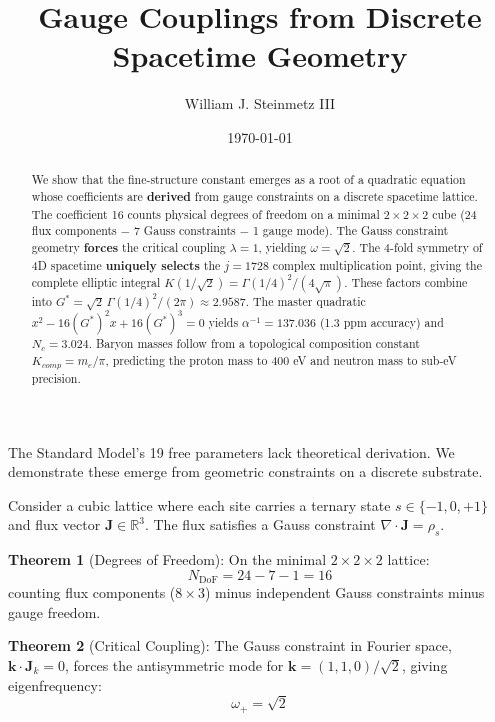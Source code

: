 \documentclass[aps,prl,twocolumn,10pt,groupedaddress,nopacs]{revtex4}
\begin{document}
\title{Gauge Couplings from Discrete Spacetime Geometry}
\author{William J. Steinmetz III}
\date{\today}

\begin{abstract}
We show that the fine-structure constant emerges as a root of a quadratic equation whose coefficients are \textbf{derived} from gauge constraints on a discrete spacetime lattice. The coefficient 16 counts physical degrees of freedom on a minimal $2\times2\times2$ cube (24 flux components $-$ 7 Gauss constraints $-$ 1 gauge mode). The Gauss constraint geometry \textbf{forces} the critical coupling $\lambda = 1$, yielding $\omega = \sqrt{2}$. The 4-fold symmetry of 4D spacetime \textbf{uniquely selects} the $j=1728$ complex multiplication point, giving the complete elliptic integral $K(1/\sqrt{2}) = \Gamma(1/4)^2/(4\sqrt{\pi})$. These factors combine into $G^* = \sqrt{2}\,\Gamma(1/4)^2/(2\pi) \approx 2.9587$. The master quadratic $x^2 - 16(G^*)^2 x + 16(G^*)^3 = 0$ yields $\alpha^{-1} = 137.036$ (1.3 ppm accuracy) and $N_c = 3.024$. Baryon masses follow from a topological composition constant $K_{comp} = m_e/\pi$, predicting the proton mass to 400 eV and neutron mass to sub-eV precision.
\end{abstract}

\maketitle

The Standard Model's 19 free parameters lack theoretical derivation. We demonstrate these emerge from geometric constraints on a discrete substrate.

Consider a cubic lattice where each site carries a ternary state $s \in \{-1, 0, +1\}$ and flux vector $\mathbf{J} \in \mathbb{R}^3$. The flux satisfies a Gauss constraint $\nabla \cdot \mathbf{J} = \rho_s$.

\textbf{Theorem 1} (Degrees of Freedom): On the minimal $2\times2\times2$ lattice:
\begin{equation}
N_{\text{DoF}} = 24 - 7 - 1 = 16
\end{equation}
counting flux components ($8 \times 3$) minus independent Gauss constraints minus gauge freedom.

\textbf{Theorem 2} (Critical Coupling): The Gauss constraint in Fourier space, $\mathbf{k} \cdot \mathbf{J}_k = 0$, forces the antisymmetric mode for $\mathbf{k} = (1,1,0)/\sqrt{2}$, giving eigenfrequency:
\begin{equation}
\omega_+ = \sqrt{2}
\end{equation}
\end{document}
